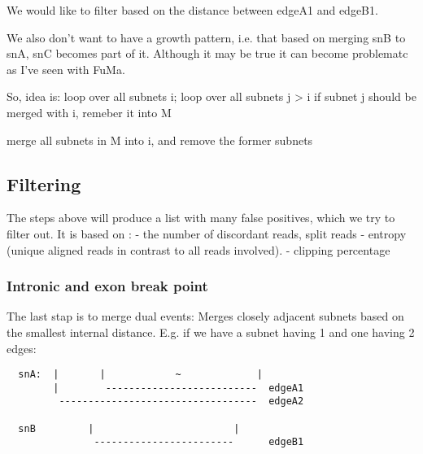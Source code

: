 \documentclass{article}
\theoremstyle{definition}
\begin{document}
        We would like to filter based on the distance between edgeA1 and
        edgeB1.
        
        We also don't want to have a growth pattern, i.e. that based on
        merging snB to snA, snC becomes part of it. Although it may be
        true it can become problematc as I've seen with FuMa.
        
        So, idea is:
        loop over all subnets i;
            loop over all subnets j > i
                if subnet j should be merged with i, remeber it into M
            
            merge all subnets in M into i, and remove the former subnets


\clearpage

\subsection{Filtering}
The steps above will produce a list with many false positives, which we try to filter out.
It is based on :
- the number of discordant reads, split reads
- entropy (unique aligned reads in contrast to all reads involved).
- clipping percentage

\subsubsection{Intronic and exon break point}
The last stap is to merge dual events:
Merges closely adjacent subnets based on the smallest internal distance.
E.g. if we have a subnet having 1 and one having 2 edges:

\begin{verbatim}
  snA:  |       |            ~             |
        |        --------------------------  edgeA1
         ----------------------------------  edgeA2

  snB         |                        |
               ------------------------      edgeB1


\end{verbatim}        
\end{document}
